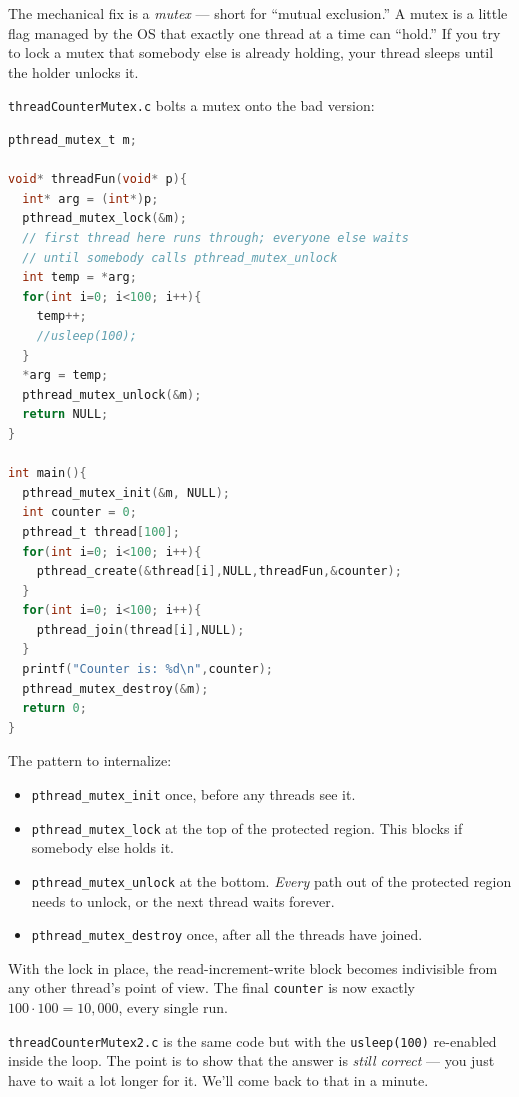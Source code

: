 \documentclass[11pt]{article}
\begin{document}
The mechanical fix is a \emph{mutex} --- short for ``mutual
exclusion.'' A mutex is a little flag managed by the OS that exactly
one thread at a time can ``hold.'' If you try to lock a mutex that
somebody else is already holding, your thread sleeps until the holder
unlocks it.

\texttt{threadCounterMutex.c} bolts a mutex onto the bad version:

\begin{lstlisting}[language=C]
pthread_mutex_t m;

void* threadFun(void* p){
  int* arg = (int*)p;
  pthread_mutex_lock(&m);
  // first thread here runs through; everyone else waits
  // until somebody calls pthread_mutex_unlock
  int temp = *arg;
  for(int i=0; i<100; i++){
    temp++;
    //usleep(100);
  }
  *arg = temp;
  pthread_mutex_unlock(&m);
  return NULL;
}

int main(){
  pthread_mutex_init(&m, NULL);
  int counter = 0;
  pthread_t thread[100];
  for(int i=0; i<100; i++){
    pthread_create(&thread[i],NULL,threadFun,&counter);
  }
  for(int i=0; i<100; i++){
    pthread_join(thread[i],NULL);
  }
  printf("Counter is: %d\n",counter);
  pthread_mutex_destroy(&m);
  return 0;
}
\end{lstlisting}

The pattern to internalize:
\begin{itemize}
  \item \texttt{pthread\_mutex\_init} once, before any threads see it.
  \item \texttt{pthread\_mutex\_lock} at the top of the protected
    region. This blocks if somebody else holds it.
  \item \texttt{pthread\_mutex\_unlock} at the bottom. \emph{Every}
    path out of the protected region needs to unlock, or the next
    thread waits forever.
  \item \texttt{pthread\_mutex\_destroy} once, after all the threads
    have joined.
\end{itemize}

With the lock in place, the read-increment-write block becomes
indivisible from any other thread's point of view. The final
\texttt{counter} is now exactly $100 \cdot 100 = 10{,}000$, every
single run.

\texttt{threadCounterMutex2.c} is the same code but with the
\texttt{usleep(100)} re-enabled inside the loop. The point is to show
that the answer is \emph{still correct} --- you just have to wait a
lot longer for it. We'll come back to that in a minute.
\end{document}
